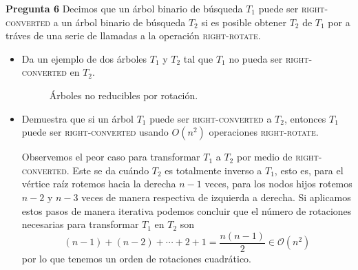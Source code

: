 \textbf{Pregunta 6}
Decimos que un árbol binario de búsqueda $T_1$ puede ser \textsc{right-converted} a un árbol binario
de búsqueda $T_2$ si es posible obtener $T_2$ de $T_1$ por a tráves de una serie de llamadas a la operación
\textsc{right-rotate}.
\begin{itemize}
\item Da un ejemplo de dos árboles $T_1$ y $T_2$ tal que  $T_1$ no pueda ser \textsc{right-converted} en $T_2$.

\begin{center}
  \begin{figure}[h]
    \centering
    \caption*{Árboles no reducibles por rotación.}
    \label{f:animales}
  \end{figure}


\end{center}


\item Demuestra que si un árbol $T_1$ puede ser \textsc{right-converted} a $T_2$, entonces $T_1$ puede ser
  \textsc{right-converted} usando $O(n^2)$ operaciones \textsc{right-rotate}.\newline

Observemos el peor caso para transformar $T_1$ a $T_2$ por medio de \textsc{right-converted}. Este se da cuándo
$T_2$ es totalmente inverso a $T_1$, esto es, para el vértice raíz rotemos hacia la derecha $n - 1$ veces,
para los nodos hijos rotemos $n - 2$ y $n - 3$ veces de manera respectiva de izquierda a derecha. Si aplicamos
estos pasos de manera iterativa podemos concluir que el número de rotaciones necesarias para transformar $T_1$
en $T_2$ son
\[(n - 1) + (n - 2) + \dotsm + 2 + 1 = \frac{n(n - 1)}{2} \in \mathcal{O}(n^2)\]
por lo que tenemos un orden de rotaciones cuadrático.
\end{itemize} 
